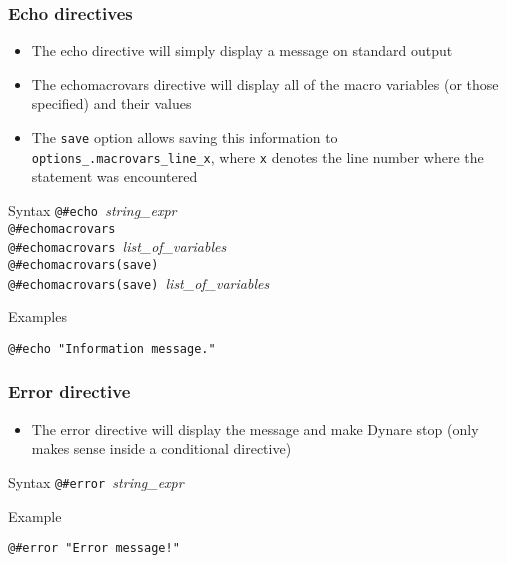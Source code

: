 \documentclass[aspectratio=169]{beamer}
\begin{document}
\begin{frame}[fragile=singleslide]
  \frametitle{Echo directives}

  \begin{itemize}
  \item The echo directive will simply display a message on standard output
  \item The echomacrovars directive will display all of the macro variables (or
    those specified) and their values
  \item The \texttt{save} option allows saving this information to \texttt{options\_.macrovars\_line\_x}, where \texttt{x} denotes the line number where the statement was encountered
  \end{itemize}

  \begin{block}{Syntax}
    \verb+@#echo +\textit{string\_expr} \\
    \verb+@#echomacrovars +\\
    \verb+@#echomacrovars +\textit{list\_of\_variables}\\
    \verb+@#echomacrovars(save)+\\
    \verb+@#echomacrovars(save) +\textit{list\_of\_variables}\\
  \end{block}

  \begin{block}{Examples}
\begin{verbatim}
@#echo "Information message."
\end{verbatim}
  \end{block}
\end{frame}

\begin{frame}[fragile=singleslide]
  \frametitle{Error directive}

  \begin{itemize}
      \item The error directive will display the message and make Dynare stop (only makes sense inside a conditional directive)
  \end{itemize}

  \begin{block}{Syntax}
    \verb+@#error +\textit{string\_expr} \\
  \end{block}

  \begin{block}{Example}
\begin{verbatim}
@#error "Error message!"
\end{verbatim}
  \end{block}
\end{frame}
\end{document}
